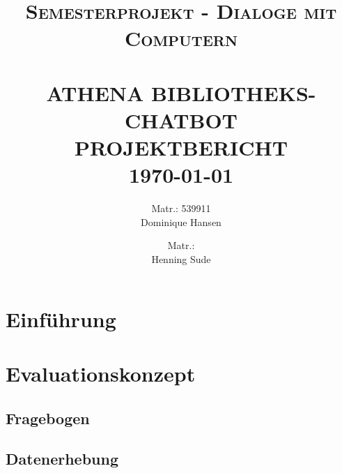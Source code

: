 \documentclass[12pt,a4paper]{article}
\title{ \normalsize \textsc{Semesterprojekt - Dialoge mit Computern}
		\\ [2.0cm]
		\HRule{0.5pt} \\ [0.2cm]
		{\Large \textbf{\uppercase{Athena Bibliotheks-chatbot}}} \\
	    {\large \textbf{\uppercase{Projektbericht}}}
		\HRule{2pt} \\ [0.5cm]
		\normalsize \today \vspace*{5\baselineskip}}
\date{}
\author{
		Matr.: 539911 \\ 
		Dominique Hansen \\
		\and
		Matr.: \\
		Henning Sude \\}
\begin{document}
\maketitle

\clearpage

\tableofcontents
\clearpage

\section{Einführung}

\section{Evaluationskonzept}

\subsection{Fragebogen}

\subsection{Datenerhebung}
\end{document}
